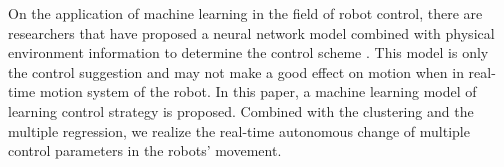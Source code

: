 On the application of machine learning in the field of robot control, there are researchers that have proposed a neural network model combined with physical environment information to determine the control scheme \cite{InformationDriven} \cite{NovelPlasticityRule}. This model is only the control suggestion and may not make a good effect on motion when in real-time motion system of the robot. In this paper, a machine learning model of learning control strategy is proposed. Combined with the clustering and the multiple regression, we realize the real-time autonomous change of multiple control parameters in the robots' movement.
